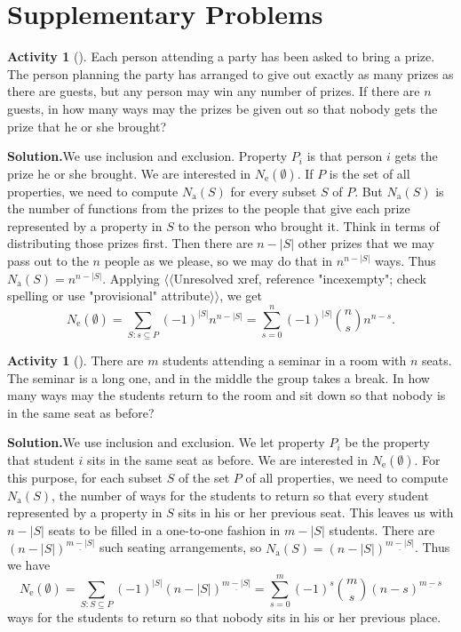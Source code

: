 \documentclass[10pt,]{book}
\theoremstyle{plain}
\theoremstyle{definition}
\newtheorem{activity}[project]{Activity}
\numberwithin{equation}{chapter}
\begin{document}
\section[{Supplementary Problems}]{Supplementary Problems}\label{sec_inclexcl-suppprobs}
\begin{activity}[]\label{activity-240}
Each person attending a party has been asked to bring a prize. The person planning the party has arranged to give out exactly as many prizes as there are guests, but any person may win any number of prizes. If there are \(n\) guests, in how many ways may the prizes be given out so that nobody gets the prize that he or she brought?%
\par\medskip\noindent%
\textbf{Solution.}\quad We use inclusion and exclusion. Property \(P_i\) is that person \(i\) gets the prize he or she brought. We are interested in \(N_{\mbox{e} }(\emptyset)\). If \(P\) is the set of all properties, we need to compute \(N_{\mbox{a} }(S)\) for every subset \(S\) of \(P\). But \(N_{\mbox{a} }(S)\) is the number of functions from the prizes to the people that give each prize represented by a property in \(S\) to the person who brought it. Think in terms of distributing those prizes first. Then there are \(n-|S|\) other prizes that we may pass out to the \(n\) people as we please, so we may do that in \(n^{n-|S|}\) ways. Thus \(N_{\mbox{a} }(S)=n^{n-|S|}\). Applying {$\langle\langle$Unresolved xref, reference "incexempty"; check spelling or use "provisional" attribute$\rangle\rangle$}, we get%
\begin{equation*}
N_{\mbox{e} }(\emptyset)=\sum_{S:s\subseteq P}(-1)^{|S|} n^{n-|S|} =
\sum_{s=0}^n (-1)^{|S|}\binom{n}{s}n^{n-s}.
\end{equation*}
%
\end{activity}
\begin{activity}[]\label{activity-241}
There are \(m\) students attending a seminar in a room with \(n\) seats. The seminar is a long one, and in the middle the group takes a break. In how many ways may the students return to the room and sit down so that nobody is in the same seat as before?%
\par\medskip\noindent%
\textbf{Solution.}\quad We use inclusion and exclusion. We let property \(P_i\) be the property that student \(i\) sits in the same seat as before. We are interested in \(N_{\mbox{e} }(\emptyset)\). For this purpose, for each subset \(S\) of the set \(P\) of all properties, we need to compute \(N_{\mbox{a} }(S)\), the number of ways for the students to return so that every student represented by a property in \(S\) sits in his or her previous seat. This leaves us with \(n-|S|\) seats to be filled in a one-to-one fashion in \(m-|S|\) students. There are \((n-|S|)^{\underline{m-|S|}}\) such seating arrangements, so \(N_{\mbox{a} }(S)= (n-|S|)^{\underline{m-|S|}}\). Thus we have%
\begin{equation*}
N_{\mbox{e} }(\emptyset)=\sum_{S:S\subseteq P}
(-1)^{|S|}(n-|S|)^{\underline{m-|S|}} = \sum_{s=0}^m (-1)^s\binom{m}{s}(n-s)^{\underline{m-s}}
\end{equation*}
ways for the students to return so that nobody sits in his or her previous place.%
\end{activity}
\end{document}
